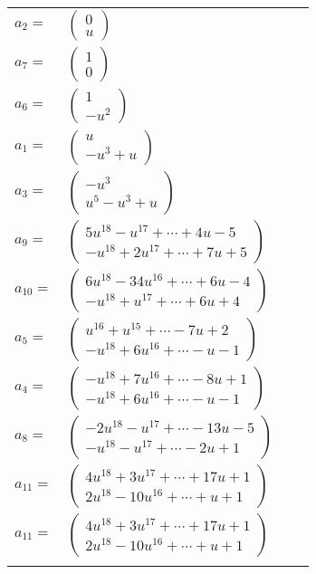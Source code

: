\documentclass[1p]{elsarticle_modified}
\theoremstyle{definition}
\begin{document}
\begin{tabular}{m{7pt} m{180pt} m{7pt} m{180pt} }
\flushright $a_{2}=$&$\begin{pmatrix}0\\u\end{pmatrix}$ \\
\flushright $a_{7}=$&$\begin{pmatrix}1\\0\end{pmatrix}$ \\
\flushright $a_{6}=$&$\begin{pmatrix}1\\- u^2\end{pmatrix}$ \\
\flushright $a_{1}=$&$\begin{pmatrix}u\\- u^3+u\end{pmatrix}$ \\
\flushright $a_{3}=$&$\begin{pmatrix}- u^3\\u^5- u^3+u\end{pmatrix}$ \\
\flushright $a_{9}=$&$\begin{pmatrix}5 u^{18}- u^{17}+\cdots+4 u-5\\- u^{18}+2 u^{17}+\cdots+7 u+5\end{pmatrix}$ \\
\flushright $a_{10}=$&$\begin{pmatrix}6 u^{18}-34 u^{16}+\cdots+6 u-4\\- u^{18}+u^{17}+\cdots+6 u+4\end{pmatrix}$ \\
\flushright $a_{5}=$&$\begin{pmatrix}u^{16}+u^{15}+\cdots-7 u+2\\- u^{18}+6 u^{16}+\cdots- u-1\end{pmatrix}$ \\
\flushright $a_{4}=$&$\begin{pmatrix}- u^{18}+7 u^{16}+\cdots-8 u+1\\- u^{18}+6 u^{16}+\cdots- u-1\end{pmatrix}$ \\
\flushright $a_{8}=$&$\begin{pmatrix}-2 u^{18}- u^{17}+\cdots-13 u-5\\- u^{18}- u^{17}+\cdots-2 u+1\end{pmatrix}$ \\
\flushright $a_{11}=$&$\begin{pmatrix}4 u^{18}+3 u^{17}+\cdots+17 u+1\\2 u^{18}-10 u^{16}+\cdots+u+1\end{pmatrix}$\\ \flushright $a_{11}=$&$\begin{pmatrix}4 u^{18}+3 u^{17}+\cdots+17 u+1\\2 u^{18}-10 u^{16}+\cdots+u+1\end{pmatrix}$\\&\end{tabular}
\end{document}
